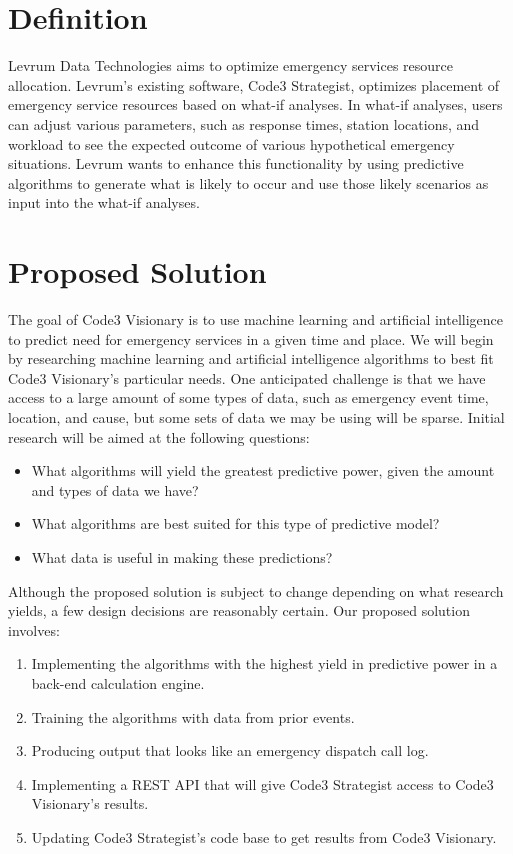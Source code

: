 \documentclass[onecolumn, draftclsnofoot,10pt, compsoc]{IEEEtran}
\begin{document}
\newpage
{}
\tableofcontents
\clearpage

\section{Definition}
Levrum Data Technologies aims to optimize emergency services resource allocation.
Levrum's existing software, Code3 Strategist, optimizes placement of emergency service resources based on what-if analyses.
In what-if analyses, users can adjust various parameters, such as response times, station locations, and workload to see the expected outcome of various hypothetical emergency situations.
Levrum wants to enhance this functionality by using predictive algorithms to generate what is likely to occur and use those likely scenarios as input into the what-if analyses. \par

\section{Proposed Solution}
 The goal of Code3 Visionary is to use machine learning and artificial intelligence to predict need for emergency services in a given time and place.
 We will begin by researching machine learning and artificial intelligence algorithms to best fit Code3 Visionary's particular needs. One anticipated challenge is that we have access to a large amount of some types of data, such as emergency event time, location, and cause, but some sets of data we may be using will be sparse.
 Initial research will be aimed at the following questions:
\begin{itemize}
    \item What algorithms will yield the greatest predictive power, given the amount and types of data we have?
    \item What algorithms are best suited for this type of predictive model?
    \item What data is useful in making these predictions?
\end{itemize}
Although the proposed solution is subject to change depending on what research yields, a few design decisions are reasonably certain. Our proposed solution involves:

\begin{enumerate}
    \item Implementing the algorithms with the highest yield in predictive power in a back-end calculation engine. 
    \item Training the algorithms with data from prior events.
    \item Producing output that looks like an emergency dispatch call log.
    \item Implementing a REST API that will give Code3 Strategist access to Code3 Visionary's results.
    \item Updating Code3 Strategist's code base to get results from Code3 Visionary.
\end{enumerate}
\end{document}
